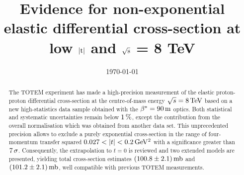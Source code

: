 \documentclass[pdftex,twocolumn,epjc3]{svjour3}
\def\un#1{\,{\rm #1}}
\begin{document}
\title{Evidence for non-exponential elastic differential cross-section at low $|\hbox{t}|$ and $\sqrt{\hbox{s}}$ = 8 TeV} %




\date{\today}

\maketitle

\begin{abstract}
The TOTEM experiment has made a high-precision measurement of the elastic 
proton-proton differential cross-section at the centre-of-mass energy 
$\sqrt s = 8\un{TeV}$ based on a new high-statistics data sample obtained with 
the $\beta^* = 90\un{m}$ optics. 
Both statistical and systematic uncertainties remain below $1\un{\%}$, except 
the contribution from the overall normalisation which was obtained from 
another data set. This unprecedented precision allows to exclude a purely exponential cross-section in the range of four-momentum transfer squared $0.027 < |t| < 0.2\un{GeV^2}$ with a significance greater than $7\un{\sigma}$. Consequently, the extrapolation to $t=0$ is reviewed and two extended models are presented, yielding total cross-section estimates $(100.8 \pm 2.1)\un{mb}$ and $(101.2 \pm 2.1)\un{mb}$, well compatible with previous TOTEM measurements.
%


\end{abstract}

\end{document}
